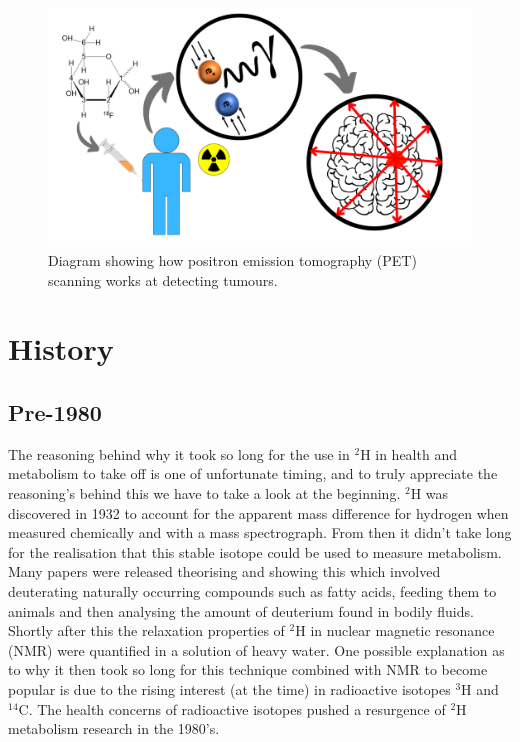 \documentclass[class=article, crop=false]{standalone}
\begin{document}
\begin{figure}
    \centering
    \includegraphics[width=1\textwidth]{Figures/Intro/PET_Scan.png}
    \caption{Diagram showing how positron emission tomography (PET) scanning works at detecting tumours.}
    \label{fig:intro:PET}
\end{figure}

\section{History}

\subsection{Pre-1980}

The reasoning behind why it took so long for the use in $^2$H in health and metabolism to take off is one of unfortunate timing, and to truly appreciate the reasoning's behind this we have to take a look at the beginning. $^2$H was discovered in 1932\cite{Urey1932AConcentration} to account for the apparent mass difference for hydrogen when measured chemically and with a mass spectrograph. From then it didn't take long for the realisation that this stable isotope could be used to measure metabolism. Many papers were released theorising and showing this\cite{Schoenheimer1935DeuteriumMetabolism,Schoenheimer1938TheMetabolism} which involved deuterating naturally occurring compounds such as fatty acids, feeding them to animals and then analysing the amount of deuterium found in bodily fluids. Shortly after this the relaxation properties of $^2$H in nuclear magnetic resonance (NMR) were quantified in a solution of heavy water\cite{Bloembergen1948RelaxationAbsorption}. One possible explanation as to why it then took so long for this technique combined with NMR to become popular is due to the rising interest (at the time)\cite{DeFeyter2021DeuteriumFuture} in radioactive isotopes $^3$H\cite{Thompson1953StudiesRat} and $^{14}$C\cite{Turteltaub1990AcceleratorDNA.}. The health concerns of radioactive isotopes pushed a resurgence of $^2$H metabolism research in the 1980's.
\end{document}
